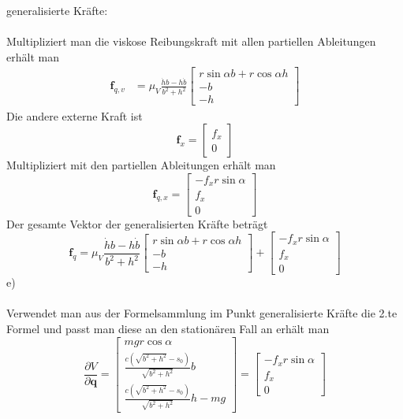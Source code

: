 \newpage
\noindent
generalisierte Kräfte:\\ \\
Multipliziert man die viskose Reibungskraft mit allen partiellen Ableitungen erhält man
\begin{align*}
	\textbf{f}_{q,v} &= \mu_V \frac{\dot{h}b - h\dot{b}}{b^2 + h^2} \left[ \begin{matrix}
		r\sin\alpha b + r\cos\alpha h \\
		-b \\
		-h
	\end{matrix}\right]
\end{align*}
Die andere externe Kraft ist
\[
	\textbf{f}_x = \left[ \begin{matrix}
		f_x \\
		0
	\end{matrix}\right]
\]
Multipliziert mit den partiellen Ableitungen erhält man
\[
	\textbf{f}_{q,x} = \left[ \begin{matrix}
		-f_x r \sin\alpha \\
		f_x \\
		0
	\end{matrix}\right]
\]
Der gesamte Vektor der generalisierten Kräfte beträgt
\[
	\textbf{f}_q = \mu_V \frac{\dot{h}b - h\dot{b}}{b^2 + h^2} \left[ \begin{matrix}
	r\sin\alpha b + r\cos\alpha h \\
	-b \\
	-h
	\end{matrix}\right] 
	+ 
	\left[ \begin{matrix}
	-f_x r \sin\alpha \\
	f_x \\
	0
	\end{matrix}\right]
\]
e) \\ \\
Verwendet man aus der Formelsammlung im Punkt generalisierte Kräfte die 2.te Formel und passt man diese an den stationären Fall an erhält man
\[
	\frac{\partial V}{\partial \textbf{q}} = \left[ \begin{matrix}
		mgr\cos\alpha\\
		\frac{c\left( \sqrt{b^2 + h^2} - s_0\right)}{\sqrt{b^2 + h^2}} b \\
		\frac{c\left( \sqrt{b^2 + h^2} - s_0\right)}{\sqrt{b^2 + h^2}} h - mg
	\end{matrix}\right]
	=
	\left[ \begin{matrix}
	-f_x r \sin\alpha \\
	f_x \\
	0
	\end{matrix}\right]
\]
